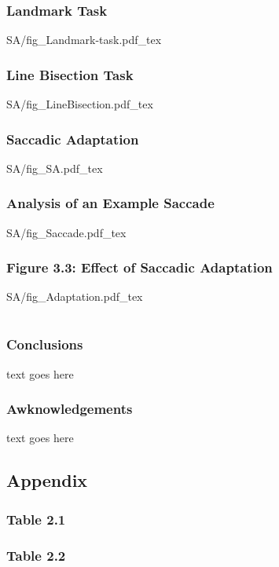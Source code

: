 \documentclass{beamer}
\begin{document}
\begin{frame}
	\frametitle{Landmark Task}
	\def\svgwidth{0.8\textwidth}
	{SA/fig_Landmark-task.pdf_tex}
\end{frame}


\begin{frame}
	\frametitle{Line Bisection Task}
	\def\svgwidth{0.9\textwidth}
	{SA/fig_LineBisection.pdf_tex}
\end{frame}

\begin{frame}
	\frametitle{Saccadic Adaptation}
	\centering
	\def\svgwidth{0.7\textwidth}
	\tiny
	{SA/fig_SA.pdf_tex}
\end{frame}


\begin{frame}
	\frametitle{Analysis of an Example Saccade}
	\centering
	\def\svgwidth{\textwidth}
	\tiny
	{SA/fig_Saccade.pdf_tex}
\end{frame}

\begin{frame}
	\frametitle{Figure 3.3: Effect of Saccadic Adaptation}
	\centering
	\def\svgwidth{0.9\textwidth}
	\tiny
	{SA/fig_Adaptation.pdf_tex}
\end{frame}


\section*{}
\begin{frame}
	\frametitle{Conclusions}
	text goes here
\end{frame}

\begin{frame}
	\frametitle{Awknowledgements}
	text goes here
\end{frame}


\subsection*{Appendix}
\begin{frame}
	\frametitle{Table 2.1}
\end{frame}

\begin{frame}
	\frametitle{Table 2.2}
	
\end{frame}
\end{document}
